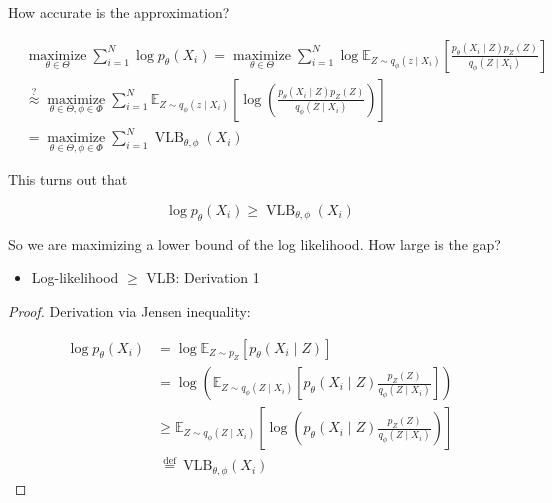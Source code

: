 \begin{concept}
    How accurate is the approximation?

    $$
    \begin{aligned}
    & \underset{\theta \in \Theta}{\operatorname{maximize}} \sum_{i=1}^{N} \log p_{\theta}\left(X_{i}\right)=\underset{\theta \in \Theta}{\operatorname{maximize}} \sum_{i=1}^{N} \log \mathbb{E}_{Z \sim q_{\phi}\left(z \mid X_{i}\right)}\left[\frac{p_{\theta}\left(X_{i} \mid Z\right) p_{Z}(Z)}{q_{\phi}\left(Z \mid X_{i}\right)}\right] \\
    & \stackrel{?}{\approx} \underset{\theta \in \Theta, \phi \in \Phi}{\operatorname{maximize}} \sum_{i=1}^{N} \mathbb{E}_{Z \sim q_{\phi}\left(z \mid X_{i}\right)}\left[\log \left(\frac{p_{\theta}\left(X_{i} \mid Z\right) p_{Z}(Z)}{q_{\phi}\left(Z \mid X_{i}\right)}\right)\right] \\
    &=\underset{\theta \in \Theta, \phi \in \Phi}{\operatorname{maximize}} \sum_{i=1}^{N} \operatorname{VLB}_{\theta, \phi}\left(X_{i}\right)
    \end{aligned}
    $$

    This turns out that 

    $$
    \log p_{\theta}\left(X_{i}\right) \geq \operatorname{VLB}_{\theta, \phi}\left(X_{i}\right)
    $$

    So we are maximizing a lower bound of the log likelihood. How large is the gap?

    \par\noindent\textcolor{gray}{\hdashrule{\textwidth}{0.4pt}{1pt 2pt}}

    \begin{itemize}
        \item Log-likelihood $\geq$ VLB: Derivation 1
    \end{itemize}

    \begin{proof}
        Derivation via Jensen inequality:

        $$
        \begin{aligned}
        \log p_{\theta}\left(X_{i}\right) & =\log \mathbb{E}_{Z \sim p_{Z}}\left[p_{\theta}\left(X_{i} \mid Z\right)\right] \\
        & =\log \left(\mathbb{E}_{Z \sim q_{\phi}\left(Z \mid X_{i}\right)}\left[p_{\theta}\left(X_{i} \mid Z\right) \frac{p_{Z}(Z)}{q_{\phi}\left(Z \mid X_{i}\right)}\right]\right) \\
        & \geq \mathbb{E}_{Z \sim q_{\phi}\left(Z \mid X_{i}\right)}\left[\log \left(p_{\theta}\left(X_{i} \mid Z\right) \frac{p_{Z}(Z)}{q_{\phi}\left(Z \mid X_{i}\right)}\right)\right] \\
        & \stackrel{\text { def }}{=} \mathrm{VLB}_{\theta, \phi}\left(X_{i}\right)
        \end{aligned}
        $$
    \end{proof}


\end{concept}
